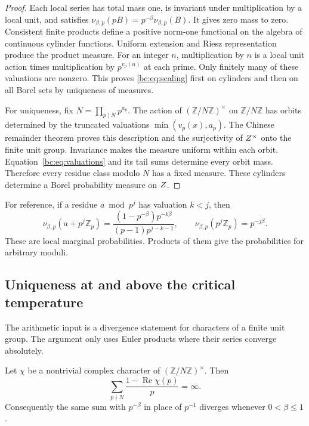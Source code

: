 \begin{proof}
Each local series has total mass one, is invariant under multiplication
by a local unit, and satisfies
\(\nu_{\beta,p}(pB)=p^{-\beta}\nu_{\beta,p}(B)\).
It gives zero mass to zero. Consistent finite products define a positive
norm-one functional on the algebra of continuous cylinder functions.
Uniform extension and Riesz representation produce the product measure.
For an integer \(n\), multiplication by \(n\) is a local unit action
times multiplication by \(p^{v_p(n)}\) at each prime. Only finitely many
of these valuations are nonzero. This proves \eqref{bc:eq:scaling} first
on cylinders and then on all Borel sets by uniqueness of measures.

For uniqueness, fix \(N=\prod_{p\mid N}p^{a_p}\). The action of
\((\mathbb Z/N\mathbb Z)^\times\) on \(\mathbb Z/N\mathbb Z\) has
orbits determined by the truncated valuations
\(\min(v_p(x),a_p)\). The Chinese remainder theorem proves this
description and the surjectivity of \(Z^{\times}\) onto the finite unit group.
Invariance makes the measure uniform within each orbit.
Equation~\eqref{bc:eq:valuations} and its tail sums determine every orbit
mass. Therefore every residue class modulo \(N\) has a fixed measure.
These cylinders determine a Borel probability measure on \(Z\).
\end{proof}

For reference, if a residue \(a\bmod p^j\) has valuation \(k<j\), then
\begin{equation}\label{bc:eq:cylinder}
 \nu_{\beta,p}(a+p^j\mathbb Z_p)
 =\frac{(1-p^{-\beta})p^{-k\beta}}{(p-1)p^{j-k-1}},
 \qquad
 \nu_{\beta,p}(p^j\mathbb Z_p)=p^{-j\beta}.
\end{equation}
These are local marginal probabilities. Products of them give the
probabilities for arbitrary moduli.

\subsection{Uniqueness at and above the critical temperature}

The arithmetic input is a divergence statement for characters of a
finite unit group. The argument only uses Euler products where their
series converge absolutely.

\begin{lemma}\label{bc:lem:divergence}
Let \(\chi\) be a nontrivial complex character of
\((\mathbb Z/N\mathbb Z)^\times\). Then
\begin{equation}\label{bc:eq:divergence}
 \sum_{p\nmid N}\frac{1-\operatorname{Re}\chi(p)}p=\infty.
\end{equation}
Consequently the same sum with \(p^{-\beta}\) in place of \(p^{-1}\)
diverges whenever \(0<\beta\leq1\).
\end{lemma}

